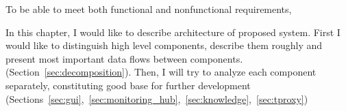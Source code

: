 To be able to meet both functional and nonfunctional requirements, 


In this chapter, I would like to describe architecture of proposed system. First I would like to distinguish high level
components, describe them roughly and present most important data flows between components.
(Section~\ref{sec:decomposition}). Then, I will try to analyze each component separately, constituting good base
for further development
(Sections~\ref{sec:gui},~\ref{sec:monitoring_hub},~\ref{sec:knowledge},~\ref{sec:tproxy})












